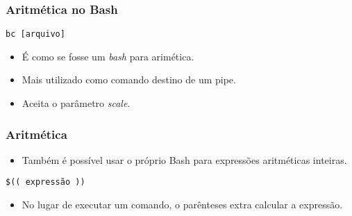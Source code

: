 \documentclass{beamer}
\begin{document}
\begin{frame}[fragile]
   \frametitle{Aritmética no Bash}
   \begin{center}
      \begin{verbatim}
bc [arquivo]
      \end{verbatim}
   \end{center}
   \begin{itemize}
      \item É como se fosse um \textit{bash} para arimética.
      \item Mais utilizado como comando destino de um pipe.
      \item Aceita o parâmetro \textit{scale}.
   \end{itemize}
\end{frame}

\begin{frame}[fragile]
   \frametitle{Aritmética}
   \begin{itemize}
      \item Também é possível usar o próprio Bash para expressões aritméticas inteiras.
   \end{itemize}
   \begin{center}
      \begin{verbatim}
$(( expressão ))
      \end{verbatim}
   \end{center}
   \begin{itemize}
      \item No lugar de executar um comando, o parênteses extra calcular a expressão.
   \end{itemize}
\end{frame}


\end{document}

